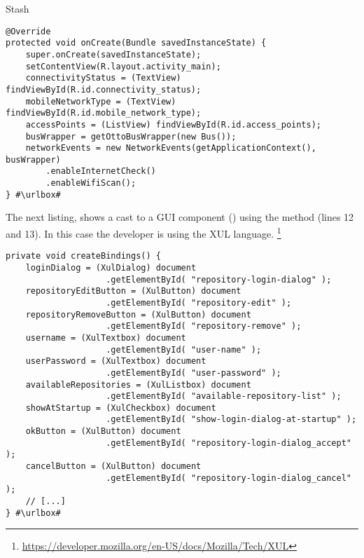 \begin{pattern}{Stash}
\def\urlvar{http://bit.ly/pwittchen_NetworkEvents_2HGbrMq}
\begin{verbatim}
@Override
protected void onCreate(Bundle savedInstanceState) {
    super.onCreate(savedInstanceState);
    setContentView(R.layout.activity_main);
    connectivityStatus = (TextView) findViewById(R.id.connectivity_status);
    mobileNetworkType = (TextView) findViewById(R.id.mobile_network_type);
    accessPoints = (ListView) findViewById(R.id.access_points);
    busWrapper = getOttoBusWrapper(new Bus());
    networkEvents = new NetworkEvents(getApplicationContext(), busWrapper)
        .enableInternetCheck()
        .enableWifiScan();
} #\urlbox#
\end{verbatim}

The next listing,
shows a cast to a GUI component () using the  method (lines 12 and 13).
In this case the developer is using the XUL language.%
\footnote{\url{https://developer.mozilla.org/en-US/docs/Mozilla/Tech/XUL}}

\def\urlvar{http://bit.ly/pentaho_pentaho_kettle_2TswNSf}
\begin{verbatim}
private void createBindings() {
    loginDialog = (XulDialog) document
                    .getElementById( "repository-login-dialog" );
    repositoryEditButton = (XulButton) document
                    .getElementById( "repository-edit" );
    repositoryRemoveButton = (XulButton) document
                    .getElementById( "repository-remove" );
    username = (XulTextbox) document
                    .getElementById( "user-name" );
    userPassword = (XulTextbox) document
                    .getElementById( "user-password" );
    availableRepositories = (XulListbox) document
                    .getElementById( "available-repository-list" );
    showAtStartup = (XulCheckbox) document
                    .getElementById( "show-login-dialog-at-startup" );
    okButton = (XulButton) document
                    .getElementById( "repository-login-dialog_accept" );
    cancelButton = (XulButton) document
                    .getElementById( "repository-login-dialog_cancel" );
    // [...]
} #\urlbox#
\end{verbatim}


\end{pattern}
